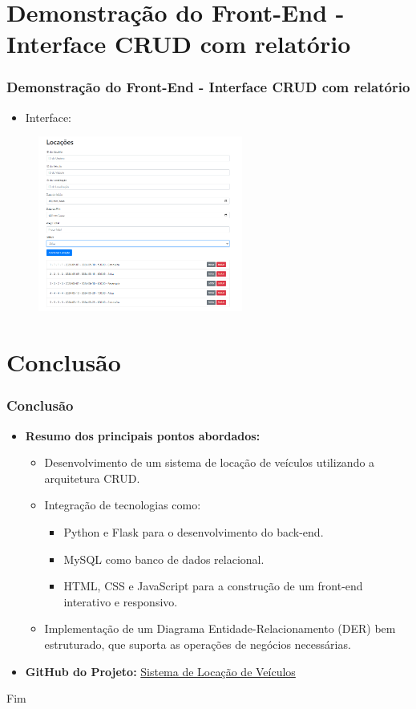 \documentclass[aspectratio=169,xcolor=dvipsnames]{beamer}
\begin{document}
\section{Demonstração do Front-End - Interface CRUD com relatório}
\begin{frame}
\frametitle{Demonstração do Front-End - Interface CRUD com relatório}
\begin{itemize}
 \item Interface:
\end{itemize}
\begin{figure}
    \includegraphics[width=0.60\textwidth]{images/relatorio.png} 
\end{figure}
\end{frame}

\section{Conclusão}
\begin{frame}
\frametitle{Conclusão}
\begin{itemize}
    \item \textbf{Resumo dos principais pontos abordados:}
    \begin{itemize}
        \item Desenvolvimento de um sistema de locação de veículos utilizando a arquitetura CRUD.
        \item Integração de tecnologias como:
        \begin{itemize}
            \item Python e Flask para o desenvolvimento do back-end.
            \item MySQL como banco de dados relacional.
            \item HTML, CSS e JavaScript para a construção de um front-end interativo e responsivo.
        \end{itemize}
        \item Implementação de um Diagrama Entidade-Relacionamento (DER) bem estruturado, que suporta as operações de negócios necessárias.
    \end{itemize}
    \item \textbf{GitHub do Projeto:} \href{https://github.com/Igor-Calille/Python-Projects/tree/main/Sistema-Loca\%C3\%A7\%C3\%A3o-Veiculos}{Sistema de Locação de Veículos}
\end{itemize}
\end{frame}





\begin{frame}
    \Huge{\centerline{Fim}}
\end{frame}
\end{document}
